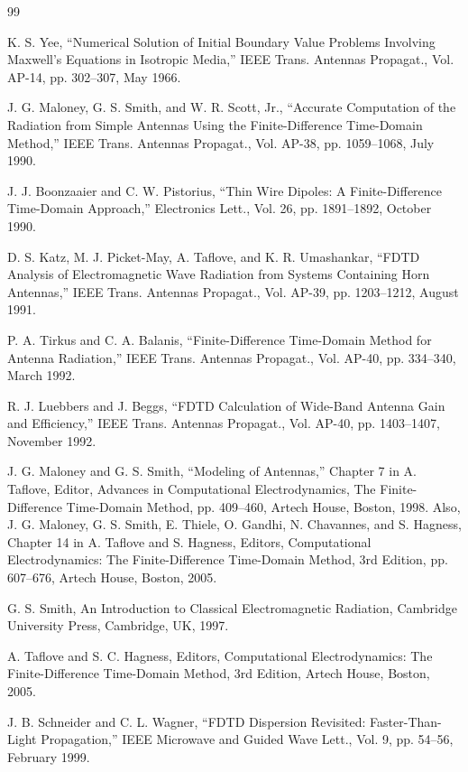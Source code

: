 \begin{thebibliography}{99}

  K. S. Yee, ``Numerical Solution of Initial Boundary Value Problems Involving Maxwell's Equations in Isotropic Media,'' IEEE Trans. Antennas Propagat., Vol. AP-14, pp. 302--307, May 1966.

 J. G. Maloney, G. S. Smith, and W. R. Scott, Jr., ``Accurate Computation of the Radiation from Simple Antennas Using the Finite-Difference Time-Domain Method,'' IEEE Trans. Antennas Propagat., Vol. AP-38, pp. 1059--1068, July 1990.

 J. J. Boonzaaier and C. W. Pistorius, ``Thin Wire Dipoles: A Finite-Difference Time-Domain Approach,'' Electronics Lett., Vol. 26, pp. 1891--1892, October 1990.

 D. S. Katz, M. J. Picket-May, A. Taflove, and K. R. Umashankar, ``FDTD Analysis of Electromagnetic Wave Radiation from Systems Containing Horn Antennas,'' IEEE Trans. Antennas Propagat., Vol. AP-39, pp. 1203--1212, August 1991.

 P. A. Tirkus and C. A. Balanis, ``Finite-Difference Time-Domain Method for Antenna Radiation,'' IEEE Trans. Antennas Propagat., Vol. AP-40, pp. 334--340, March 1992.

 R. J. Luebbers and J. Beggs, ``FDTD Calculation of Wide-Band Antenna Gain and Efficiency,'' IEEE Trans. Antennas Propagat., Vol. AP-40, pp. 1403--1407, November 1992.

 J. G. Maloney and G. S. Smith, ``Modeling of Antennas,'' Chapter 7 in A. Taflove, Editor, Advances in Computational Electrodynamics, The Finite-Difference Time-Domain Method, pp. 409--460, Artech House, Boston, 1998. Also, J. G. Maloney, G. S. Smith, E. Thiele, O. Gandhi, N. Chavannes, and S. Hagness, Chapter 14 in A. Taflove and S. Hagness, Editors, Computational Electrodynamics: The Finite-Difference Time-Domain Method, 3rd Edition, pp. 607--676, Artech House, Boston, 2005.

 G. S. Smith, An Introduction to Classical Electromagnetic Radiation, Cambridge University Press, Cambridge, UK, 1997.

 A. Taflove and S. C. Hagness, Editors, Computational Electrodynamics: The Finite-Difference Time-Domain Method, 3rd Edition, Artech House, Boston, 2005.

 J. B. Schneider and C. L. Wagner, ``FDTD Dispersion Revisited: Faster-Than-Light Propagation,'' IEEE Microwave and Guided Wave Lett., Vol. 9, pp. 54--56, February 1999.


\end{thebibliography}
